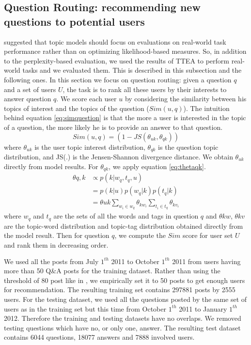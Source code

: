 {{{{{{{\subsection{Question Routing: recommending new questions to potential users}
\label{sec:qrouting}
\cite{Chang09} suggested that topic models should focus on evaluations on real-world task performance rather than on optimizing likelihood-based measures. So, in addition to the perplexity-based evaluation, we used the results of TTEA to perform real-world tasks and we evaluated them. This is described in this subsection and the following ones.
In this section we focus on question routing: given a question $q$ and a set of users $U$, the task is to rank all these users by their interests to answer question $q$.
We score each user $u$ by considering the similarity between his topics of interest and the topics of the question ($Sim(u,q)$). The intuition behind equation \ref{eq:simquestion} is that the more a user is interested in the topic of a question, the more likely he is to provide an answer to that question.
\begin{equation}
Sim(u,q) = (1 -JS(\theta_{uk},\theta_{qk}))
\label{eq:simquestion}
\end{equation}
where $\theta_{uk}$ is the user topic interest distribution, $\theta_{qk}$ is the question topic distribution, and JS(.) is the Jensen-Shannon divergence distance. We obtain $\theta_{uk}$ directly from model results. For $\theta_{qk}$, we apply equation \ref{eq:thetaqk}.
\begin{equation}
\begin{split}
\theta{q,k} &\propto p(k|w_q,t_q,u) \\
           &=p(k|u)p(w_q|k)p(t_q|k) \\
           &= \theta{uk} \sum_{w_i \in w_q} \theta_{kw_i} \sum_{t_i \in t_q} \theta_{kv_i} 
\end{split}
\label{eq:thetaqk}
\end{equation}
where $w_q$ and $t_q$ are the sets of all the words and tags in question $q$ and $\theta{kw}$, $\theta{kv}$ are the topic-word distribution and topic-tag distribution obtained directly from the model result. Then for question $q$, we compute the $Sim$ score for user set $U$ and rank them in decreasing order. %


We used all the posts from July $1^{th}$ 2011 to October $1^{th}$ 2011 from users having more than 50 Q\&A posts for the training dataset. Rather than using the threshold of 80 post like in \cite{yang2013cqarank}, we empirically set it to 50 posts to get enough users for recommendation. 
The resulting training set contains 297881 posts by 2555 users. For the testing dataset, we used all the questions posted by the same set of users as in the training set but this time from October $1^{th}$ 2011 to January $1^{th}$ 2012. Therefore the training and testing datasets have no overlaps. We removed testing questions which have no, or only one, answer. The resulting test dataset contains 6044 questions, 18077 answers and 7888 involved users. 

}}}}}}}
